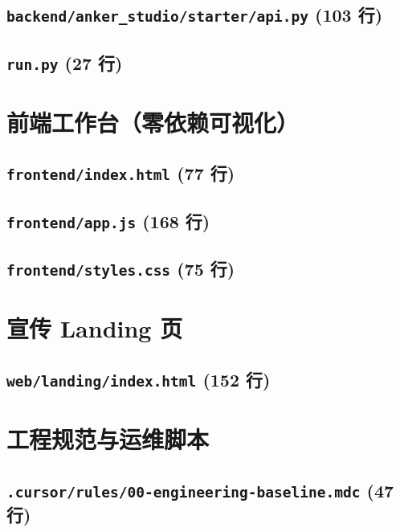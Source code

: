 \subsection*{\texttt{backend/anker\_studio/starter/api.py} \hfill \normalfont\small (103 行)}


\subsection*{\texttt{run.py} \hfill \normalfont\small (27 行)}


\section{前端工作台（零依赖可视化）}
\subsection*{\texttt{frontend/index.html} \hfill \normalfont\small (77 行)}


\subsection*{\texttt{frontend/app.js} \hfill \normalfont\small (168 行)}


\subsection*{\texttt{frontend/styles.css} \hfill \normalfont\small (75 行)}


\section{宣传 Landing 页}
\subsection*{\texttt{web/landing/index.html} \hfill \normalfont\small (152 行)}


\section{工程规范与运维脚本}
\subsection*{\texttt{.cursor/rules/00-engineering-baseline.mdc} \hfill \normalfont\small (47 行)}


